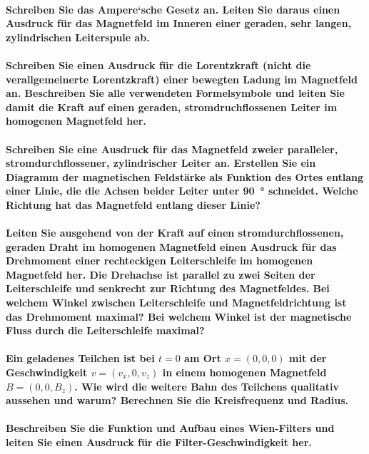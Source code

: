 \documentclass[a4paper, 11pt, parskip=half]{scrartcl}
\begin{document}
\paragraph{Schreiben Sie das Ampere‘sche Gesetz an. Leiten Sie daraus einen Ausdruck für das
Magnetfeld im Inneren einer geraden, sehr langen, zylindrischen Leiterspule ab.}

\paragraph{Schreiben Sie einen Ausdruck für die Lorentzkraft (nicht die verallgemeinerte
Lorentzkraft) einer bewegten Ladung im Magnetfeld an. Beschreiben Sie alle verwendeten Formelsymbole
und leiten Sie damit die Kraft auf einen geraden, stromdruchflossenen Leiter im homogenen Magnetfeld
her.}

\paragraph{Schreiben Sie eine Ausdruck für das Magnetfeld zweier paralleler, stromdurchflossener,
zylindrischer Leiter an. Erstellen Sie ein Diagramm der magnetischen Feldstärke als Funktion des
Ortes entlang einer Linie, die die Achsen beider Leiter unter \SI{90}{\degree} schneidet. Welche
Richtung hat das Magnetfeld entlang dieser Linie?}

\paragraph{Leiten Sie ausgehend von der Kraft auf einen stromdurchflossenen, geraden Draht im
homogenen Magnetfeld einen Ausdruck für das Drehmoment einer rechteckigen Leiterschleife im
homogenen Magnetfeld her. Die Drehachse ist parallel zu zwei Seiten der Leiterschleife und senkrecht
zur Richtung des Magnetfeldes. Bei welchem Winkel zwischen Leiterschleife und Magnetfeldrichtung ist
das Drehmoment maximal? Bei welchem Winkel ist der magnetische Fluss durch die Leiterschleife
maximal?}

\paragraph{Ein geladenes Teilchen ist bei $t=0$ am Ort $x=(0,0,0)$ mit der Geschwindigkeit
$v=(v_x,0,v_z)$ in einem homogenen Magnetfeld $B=(0,0,B_z)$. Wie wird die weitere Bahn des Teilchens
qualitativ aussehen und warum? Berechnen Sie die Kreisfrequenz und Radius.}

\paragraph{Beschreiben Sie die Funktion und Aufbau eines Wien-Filters und leiten Sie einen Ausdruck
für die Filter-Geschwindigkeit her.}
\end{document}
